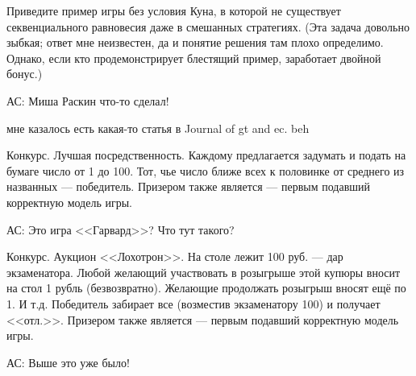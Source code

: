 \begin{problem}
 Приведите пример игры без условия Куна, в которой не существует секвенциального равновесия даже в смешанных стратегиях. (Эта задача довольно зыбкая; ответ мне неизвестен, да и понятие решения там плохо определимо. Однако, если кто продемонстрирует блестящий пример, заработает двойной бонус.)

{\red АС: Миша Раскин что-то сделал!}

\begin{source}
\cite{savva:nmu}
\end{source}


\begin{sol}
мне казалось есть какая-то статья в Journal of gt and ec. beh
\end{sol}
\end{problem}







\begin{problem}
Конкурс. Лучшая посредственность. Каждому предлагается задумать и подать на
бумаге число от 1 до 100. Тот, чье число ближе всех
к половинке от среднего из названных --- победитель.
Призером также является --- первым подавший
корректную модель игры.

{\red АС: Это игра <<Гарвард>>? Что тут такого?}


\begin{sol}

\end{sol}
\end{problem}




\begin{problem}[<<Лохотрон-??>>]
 Конкурс. Аукцион <<Лохотрон>>. На столе лежит 100 руб. --- дар
экзаменатора. Любой желающий участвовать в
розыгрыше этой купюры вносит на стол 1 рубль
(безвозвратно). Желающие продолжать розыгрыш вносят
ещё по 1. И т.д. Победитель забирает все (возместив
экзаменатору 100) и получает <<отл.>>. Призером также
является --- первым подавший корректную модель игры.

{\red АС:  Выше это уже было!}


\begin{sol}

\end{sol}
\end{problem}



